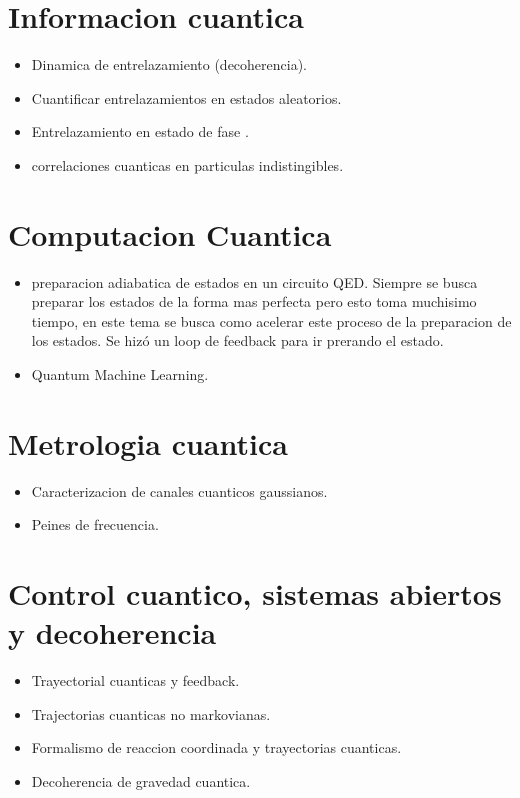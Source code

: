 \documentclass{article}
\begin{document}
\section{Informacion cuantica }
\begin{itemize}
  \item Dinamica de entrelazamiento (decoherencia). 
  \item Cuantificar entrelazamientos en estados aleatorios. 
  \item Entrelazamiento en estado de fase . 
  \item correlaciones cuanticas en particulas indistingibles. 
\end{itemize}

\section{Computacion Cuantica }
\begin{itemize}
  \item preparacion adiabatica de estados en un circuito QED. Siempre se busca preparar los estados de la forma mas perfecta pero esto toma muchisimo tiempo, en este tema se busca como acelerar este proceso de la preparacion de los estados. Se hizó un loop de feedback para ir prerando el estado. 
  \item Quantum Machine Learning. 
\end{itemize}

\section{Metrologia cuantica }
\begin{itemize}
  \item Caracterizacion de canales cuanticos gaussianos. 
  \item Peines de frecuencia. 
\end{itemize}

\section{Control cuantico, sistemas abiertos y decoherencia }
\begin{itemize}
  \item Trayectorial cuanticas y feedback. 
  \item Trajectorias cuanticas no markovianas. 
  \item Formalismo de reaccion coordinada y trayectorias cuanticas. 
  \item Decoherencia de gravedad cuantica. 
\end{itemize}
\end{document}
